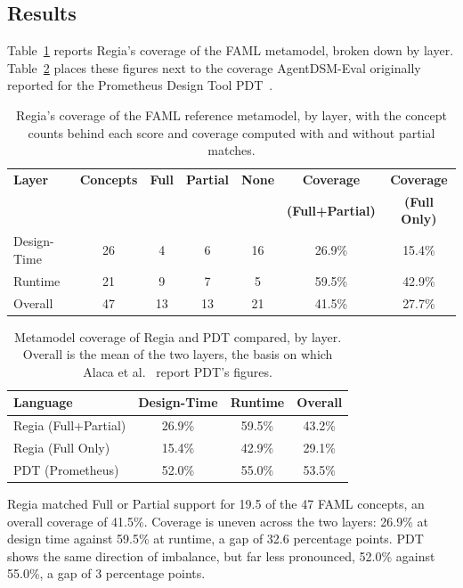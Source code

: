 \subsection{Results}
\label{sec:faml-comparison-results}
 
Table~\ref{tab:faml-coverage} reports Regia's coverage of the FAML metamodel, broken down by layer. Table~\ref{tab:faml-pdt-comparison} places these figures next to the coverage AgentDSM-Eval originally reported for the Prometheus Design Tool PDT~\cite{Alaca2021}.
 
\begin{table}[h]
\centering
\small
\begin{tabular}{|l|c|c|c|c|c|c|}
\hline
\textbf{Layer} & \textbf{Concepts} & \textbf{Full} & \textbf{Partial} & \textbf{None} & \textbf{Coverage} & \textbf{Coverage} \\
 & & & & & \textbf{(Full+Partial)} & \textbf{(Full Only)} \\
\hline
Design-Time & 26 & 4  & 6  & 16 & 26.9\% & 15.4\% \\
Runtime     & 21 & 9  & 7  & 5  & 59.5\% & 42.9\% \\
\hline
Overall     & 47 & 13 & 13 & 21 & 41.5\% & 27.7\% \\
\hline
\end{tabular}
\caption{Regia's coverage of the FAML reference metamodel, by layer, with the concept counts behind each score and coverage computed with and without partial matches.}
\label{tab:faml-coverage}
\end{table}
 
\begin{table}[h]
\centering
\begin{tabular}{|l|c|c|c|}
\hline
\textbf{Language} & \textbf{Design-Time} & \textbf{Runtime} & \textbf{Overall} \\
\hline
Regia (Full+Partial) & 26.9\% & 59.5\% & 43.2\% \\
Regia (Full Only)    & 15.4\% & 42.9\% & 29.1\% \\
PDT (Prometheus) & 52.0\% & 55.0\% & 53.5\% \\
\hline
\end{tabular}
\caption{Metamodel coverage of Regia and PDT compared, by layer. Overall is the mean of the two layers, the basis on which Alaca et al.~\cite{Alaca2021} report PDT's figures.}
\label{tab:faml-pdt-comparison}
\end{table}
 
Regia matched Full or Partial support for 19.5 of the 47 FAML concepts, an overall coverage of 41.5\%. Coverage is uneven across the two layers: 26.9\% at design time against 59.5\% at runtime, a gap of 32.6 percentage points. PDT shows the same direction of imbalance, but far less pronounced, 52.0\% against 55.0\%, a gap of 3 percentage points.
 
